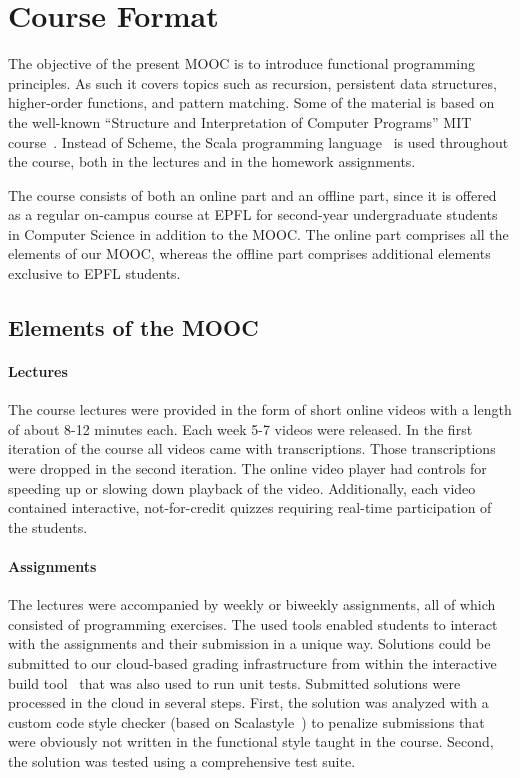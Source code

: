 \documentclass{sig-alternate}
\begin{document}
\section{Course Format}

The objective of the present MOOC is to introduce functional programming
principles. As such it covers topics such as recursion, persistent data
structures, higher-order functions, and pattern matching. Some of the material
is based on the well-known ``Structure and Interpretation of Computer
Programs'' MIT course~\cite{Abelson85}. Instead of Scheme, the Scala
programming language~\cite{Odersky-Spoon-Venners07} is used throughout the
course, both in the lectures and in the homework assignments.

The course consists of both an online part and an offline part, since it is
offered as a regular on-campus course at EPFL for second-year undergraduate
students in Computer Science in addition to the MOOC. The online part
comprises all the elements of our MOOC, whereas the offline part comprises
additional elements exclusive to EPFL students.

\subsection{Elements of the MOOC}\label{sec:mooc-elements}

\paragraph{Lectures} The course lectures were provided in the form of short
online videos with a length of about 8-12 minutes each. Each week 5-7 videos
were released. In the first iteration of the course all videos came with
transcriptions. Those transcriptions were dropped in the second iteration. The
online video player had controls for speeding up or slowing down playback of
the video. Additionally, each video contained interactive, not-for-credit
quizzes requiring real-time participation of the students.

\paragraph{Assignments}

The lectures were accompanied by weekly or biweekly assignments, all of which
consisted of programming exercises. The used tools enabled students to
interact with the assignments and their submission in a unique way. Solutions
could be submitted to our cloud-based grading infrastructure from within the
interactive build tool~\cite{sbt} that was also used to run unit tests.
Submitted solutions were processed in the cloud in several steps. First, the
solution was analyzed with a custom code style checker (based on
Scalastyle~\cite{ScalaStyle}) to penalize submissions that were obviously not
written in the functional style taught in the course. Second, the solution was
tested using a comprehensive test suite.
\end{document}
